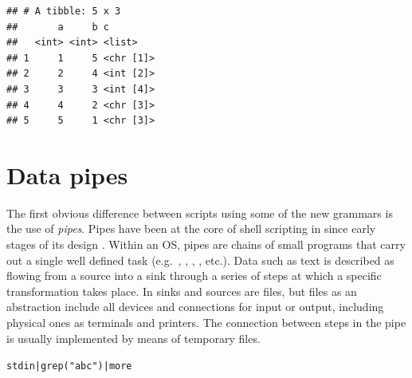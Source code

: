 \documentclass[krantz2]{krantz}\usepackage{knitr}%
\begin{document}
\begin{knitrout}\footnotesize
{}\color{fgcolor}\begin{kframe}
\begin{alltt}
\hlstd{(} \hlstd{=} \hlopt{:}\hlstd{,}  \hlstd{=} \hlopt{:}\hlstd{,}  \hlstd{=} \hlstd{(}\hlstd{,} \hlopt{:}\hlstd{,} \hlopt{:}\hlstd{, letters[}\hlopt{:}\hlstd{], letters[}\hlopt{:}\hlstd{]))}
\end{alltt}
\begin{verbatim}
## # A tibble: 5 x 3
##       a     b c        
##   <int> <int> <list>   
## 1     1     5 <chr [1]>
## 2     2     4 <int [2]>
## 3     3     3 <int [4]>
## 4     4     2 <chr [3]>
## 5     5     1 <chr [3]>
\end{verbatim}
\end{kframe}
\end{knitrout}

\section{Data pipes}

The first obvious difference between scripts using some of the new grammars is the use of \emph{pipes}. Pipes have been at the core of shell scripting in  since early stages of its design \cite{Kernigham1981}. Within an OS, pipes are chains of small programs that carry out a single well defined task (e.g.\ , , , , etc.). Data such as text is described as flowing from a source into a sink through a series of steps at which a specific transformation takes place. In  sinks and sources are files, but files as an abstraction include all devices and connections for input or output, including physical ones as terminals and printers. The connection between steps in the pipe is usually implemented by means of temporary files.

\begin{knitrout}\footnotesize
{}\color{fgcolor}\begin{kframe}
\begin{alltt}
stdin | grep("abc") | more
\end{alltt}
\end{kframe}
\end{knitrout}
\end{document}
